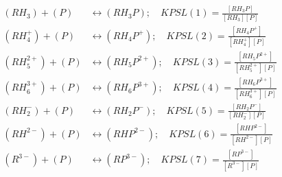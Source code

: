 \documentclass[fleqn, oneside, 11pt]{article}%
\begin{document}
\begin{preview}
\begin{align*}%
(RH_{3}) + (P) & \leftrightarrow (RH_{3}P); \quad KPSL(1)=\frac{[RH_{3}P]}{[RH_{3}][P]} \nonumber \\ 
(RH^{+}_{4}) + (P) & \leftrightarrow (RH_{4}P^{+}); \quad KPSL(2)=\frac{[RH_{4}P^{+}]}{[RH^{+}_{4}][P]} \nonumber \\ 
(RH^{2+}_{5}) + (P) & \leftrightarrow (RH_{5}P^{2+}); \quad KPSL(3)=\frac{[RH_{5}P^{2+}]}{[RH^{2+}_{5}][P]} \nonumber \\ 
(RH^{3+}_{6}) + (P) & \leftrightarrow (RH_{6}P^{3+}); \quad KPSL(4)=\frac{[RH_{6}P^{3+}]}{[RH^{3+}_{6}][P]} \nonumber \\ 
(RH^{-}_{2}) + (P) & \leftrightarrow (RH_{2}P^{-}); \quad KPSL(5)=\frac{[RH_{2}P^{-}]}{[RH^{-}_{2}][P]} \nonumber \\ 
(RH^{2-}) + (P) & \leftrightarrow (RHP^{2-}); \quad KPSL(6)=\frac{[RHP^{2-}]}{[RH^{2-}][P]} \nonumber \\ 
(R^{3-}) + (P) & \leftrightarrow (RP^{3-}); \quad KPSL(7)=\frac{[RP^{3-}]}{[R^{3-}][P]} \nonumber \\ 
\end{align*} 
\end{preview}
\end{document}
